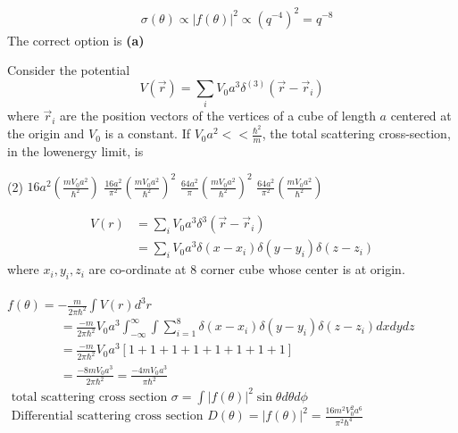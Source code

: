 \begin{enumerate}
\begin{answer}
\begin{align*}
 	&\sigma(\theta) \propto|f(\theta)|^{2} \propto\left(q^{-4}\right)^{2}=q^{-8}
 \end{align*}
 The correct option is \textbf{(a)}
\end{answer}
\begin{minipage}{\textwidth}
	\item Consider the potential
	$$
	V(\vec{r})=\sum_{i} V_{0} a^{3} \delta^{(3)}\left(\vec{r}-\vec{r}_{i}\right)
	$$
	where $\vec{r}_{i}$ are the position vectors of the vertices of a cube of length $a$ centered at the origin and $V_{0}$ is a constant. If $V_{0} a^{2}<<\frac{\hbar^{2}}{m}$, the total scattering cross-section, in the lowenergy limit, is
\end{minipage}
\begin{tasks}(2)
	\task[\textbf{A.}] $16 a^{2}\left(\frac{m V_{0} a^{2}}{\hbar^{2}}\right)$
	\task[\textbf{B.}]$\frac{16 a^{2}}{\pi^{2}}\left(\frac{m V_{0} a^{2}}{\hbar^{2}}\right)^{2}$
	\task[\textbf{C.}]$\frac{64 a^{2}}{\pi}\left(\frac{m V_{0} a^{2}}{\hbar^{2}}\right)^{2}$
	\task[\textbf{D.}]$\frac{64 a^{2}}{\pi^{2}}\left(\frac{m V_{0} a^{2}}{\hbar^{2}}\right)$
\end{tasks}
\begin{answer}
	\begin{align*}
		V(r) &=\sum_{i} V_{0} a^{3} \delta^{3}\left(\vec{r}-\vec{r}_{i}\right) \\
		&=\sum_{i} V_{0} a^{3} \delta\left(x-x_{i}\right) \delta\left(y-y_{i}\right) \delta\left(z-z_{i}\right)
	\end{align*}
	where $x_{i}, y_{i}, z_{i}$ are co-ordinate at 8 corner cube whose center is at origin.\\\\
	$
	f(\theta)=-\frac{m}{2 \pi \hbar^{2}} \int V(r) d^{3} r
	$
	\begin{align*}
		&=\frac{-m}{2 \pi \hbar^{2}} V_{0} a^{3} \int_{-\infty}^{\infty} \int \sum_{i=1}^{8} \delta\left(x-x_{i}\right) \delta\left(y-y_{i}\right) \delta\left(z-z_{i}\right) d x d y d z \\
		&=\frac{-m}{2 \pi \hbar^{2}} V_{0} a^{3}[1+1+1+1+1+1+1+1] \\
		&=\frac{-8 m V_{0} a^{3}}{2 \pi \hbar^{2}}=\frac{-4 m V_{0} a^{3}}{\pi \hbar^{2}}
	\end{align*}
	$\text { total scattering cross section } \sigma=\int|f(\theta)|^{2} \sin \theta d \theta d \phi$\\
	$\text { Differential scattering cross section } D(\theta)=|f(\theta)|^{2}=\frac{16 m^{2} V_{0}^{2} a^{6}}{\pi^{2} \hbar^{4}}$\\

\end{answer}
\end{enumerate}
